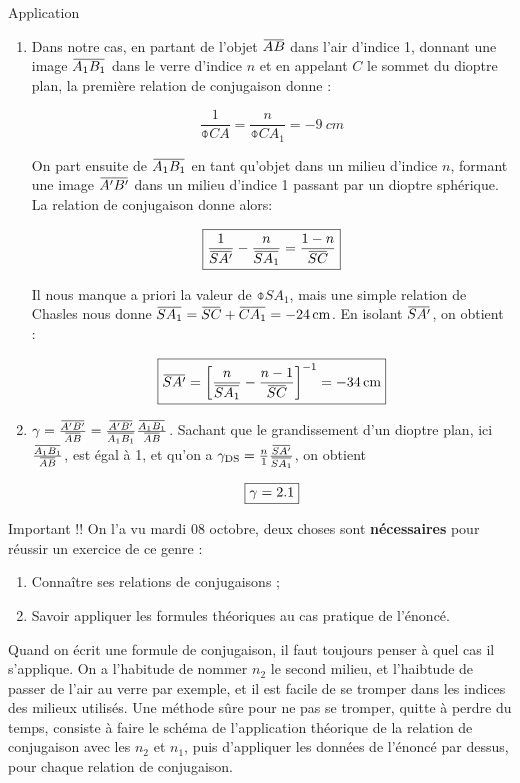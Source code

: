 \documentclass[10pt,a5paper,notitlepage]{book}
\begin{document}
\begin{NCexem}{Application}
    \begin{enumerate}

        \item Dans notre cas, en partant de l'objet $\ABb$ dans l'air d'indice
            1, donnant une image $\ABa$ dans le verre d'indice $n$ et en
            appelant $C$ le sommet du dioptre plan, la première relation de
            conjugaison donne :

            \[ \boxed{ \frac{1}{\obar{CA}} = \frac{n}{\obar{CA_1}} =
            \SI{-9}{cm}} \]
            
            On part ensuite de $\ABa$ en tant qu'objet dans un milieu d'indice
            $n$, formant une image $\ABp$ dans un milieu d'indice 1 passant par
            un dioptre sphérique. La relation de conjugaison donne alors:
            
            \[ \boxed{ \frac{1}{\SAp} - \frac{n}{\obar{SA_1}} = \frac{1 -
            n}{\SC}}\]
            
            Il nous manque a priori la valeur de $\obar{SA_1}$, mais une simple
            relation de Chasles nous donne $\obar{SA_1} = \SC + \obar{CA_1} =
            \SI{-24}{cm}$. En isolant $\SAp$, on obtient :
            
            \[ \boxed{\SAp = \left[ \frac{n}{\obar{SA_1}} - \frac{n -
            1}{\SC}\right]^{-1} = \SI{-34}{cm}}\]

        \item $\g = \frac{\ABp}{\ABb} = \frac{\ABp}{\ABa} \frac{\ABa}{\ABb}$.
            Sachant que le grandissement d'un dioptre plan, ici $
            \frac{\ABa}{\ABb}$, est égal à 1, et qu'on a $\g \St{DS} =
            \frac{n}{1} \frac{\SAp}{\obar{SA_1}}$, on obtient

            \[ \boxed{\gamma = 2.1}\]
    \end{enumerate}
    \end{NCexem}

\begin{NCimpo}{Important !!}
    On l'a vu mardi 08 octobre, deux choses sont \textbf{nécessaires} pour
    réussir un exercice de ce genre :
    \begin{enumerate}
        \item {\huge Connaître ses relations de conjugaisons} ;
        \item {\Huge Savoir appliquer les formules théoriques au cas pratique de
            l'énoncé}.
    \end{enumerate}
    Quand on écrit une formule de conjugaison, il faut toujours penser à quel
    cas il s'applique. On a l'habitude de nommer $n_2$ le second milieu, et
    l'haibtude de passer de l'air au verre par exemple, et il est facile de se
    tromper dans les indices des milieux utilisés. Une méthode sûre pour ne pas
    se tromper, quitte à perdre du temps, consiste à faire le schéma de
    l'application théorique de la relation de conjugaison avec les $n_2$ et
    $n_1$, puis d'appliquer les données de l'énoncé par dessus, pour chaque
    relation de conjugaison.
\end{NCimpo}
\end{document}
